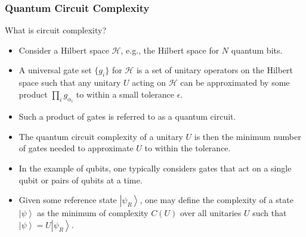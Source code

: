 \documentclass[8pt,aspectratio=169]{beamer}
\newcommand{\ket}[1]{\left| #1 \right>}
\begin{document}
\begin{frame}
\frametitle{Quantum Circuit Complexity}

What is circuit complexity?

\begin{itemize}

\item Consider a Hilbert space $\mathcal{H}$, e.g., the Hilbert space for $N$ quantum bits.

\item A universal gate set $\{g_i\}$ for $\mathcal{H}$ is a set of unitary operators on the Hilbert space such that any unitary $U$ acting on $\mathcal{H}$ can be approximated by some product $\displaystyle\prod_{i} g_{\alpha_i}$ to within a small tolerance $\epsilon$. 

\item Such a product of gates is referred to as a quantum circuit.

\item The quantum circuit complexity of a unitary $U$ is then the minimum number of gates needed to approximate $U$ to within the tolerance.

\item In the example of qubits, one typically considers gates that act on a single qubit or pairs of qubits at a time.

\item Given some reference state $\ket{\psi_R}$, one may define the complexity of a state $\ket{\psi}$ as the minimum of complexity $C(U)$ over all unitaries $U$ such that $\ket{\psi} = U\ket{\psi_R}$.

\end{itemize}

\end{frame}
\end{document}
